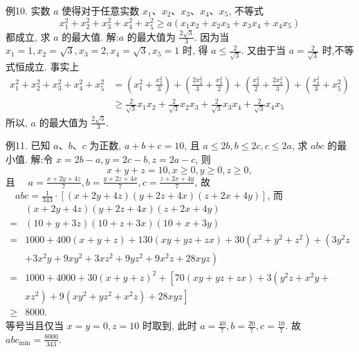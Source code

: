 例10. 实数 $a$ 使得对于任意实数 $x_1 、 x_2 、 x_3 、 x_4 、 x_5$, 不等式
$$
x_1^2+x_2^2+x_3^2+x_4^2+x_5^2 \geqslant a\left(x_1 x_2+x_2 x_3+x_3 x_4+x_4 x_5\right)
$$
都成立, 求 $a$ 的最大值.
解:$a$ 的最大值为 $\frac{2 \sqrt{3}}{3}$.
因为当 $x_1=1, x_2=\sqrt{3}, x_3=2, x_4=\sqrt{3}, x_5=1$ 时, 得 $a \leqslant \frac{2}{\sqrt{3}}$.
又由于当 $a=\frac{2}{\sqrt{3}}$ 时,不等式恒成立.
事实上
$$
\begin{aligned}
x_1^2+x_2^2+x_3^2+x_4^2+x_5^2 & =\left(x_1^2+\frac{x_2^2}{3}\right)+\left(\frac{2 x_2^2}{3}+\frac{x_3^2}{2}\right)+\left(\frac{x_3^2}{2}+\frac{2 x_4^2}{3}\right)+\left(\frac{x_4^2}{3}+x_5^2\right) \\
& \geqslant \frac{2}{\sqrt{3}} x_1 x_2+\frac{2}{\sqrt{3}} x_2 x_3+\frac{2}{\sqrt{3}} x_3 x_4+\frac{2}{\sqrt{3}} x_4 x_5
\end{aligned}
$$
所以, $a$ 的最大值为 $\frac{2 \sqrt{3}}{3}$.



例11. 已知 $a 、 b 、 c$ 为正数, $a+b+c=10$, 且 $a \leqslant 2 b, b \leqslant 2 c, c \leqslant 2 a$, 求 $a b c$ 的最小值.
解:令 $x=2 b-a, y=2 c-b, z=2 a-c$,
则
$$
x+y+z=10, x \geqslant 0, y \geqslant 0, z \geqslant 0,
$$
且 $\quad a=\frac{x+2 y+4 z}{7}, b=\frac{y+2 z+4 x}{7}, c=\frac{z+2 x+4 y}{7}$,
故 $\quad a b c=\frac{1}{343} \cdot[(x+2 y+4 z)(y+2 z+4 x)(z+2 x+4 y)]$,
而
$$
\begin{aligned}
& (x+2 y+4 z)(y+2 z+4 x)(z+2 x+4 y) \\
= & (10+y+3 z)(10+z+3 x)(10+x+3 y) \\
= & 1000+400(x+y+z)+130(x y+y z+z x)+30\left(x^2+y^2+z^2\right)+\left(3 y^2 z\right. \\
& \left.+3 x^2 y+9 x y^2+3 x z^2+9 y z^2+9 x^2 z+28 x y z\right) \\
= & 1000+4000+30(x+y+z)^2+\left[70(x y+y z+z x)+3\left(y^2 z+x^2 y+\right.\right. \\
& \left.\left.x z^2\right)+9\left(x y^2+y z^2+x^2 z\right)+28 x y z\right] \\
\geqslant & 8000 .
\end{aligned}
$$
等号当且仅当 $x=y=0, z=10$ 时取到, 此时 $a=\frac{40}{7}, b=\frac{20}{7}, c=\frac{10}{7}$.
故 $a b c_{\min }=\frac{8000}{343}$.



